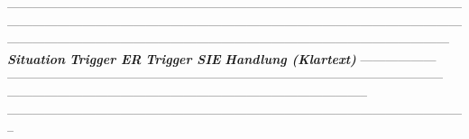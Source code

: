 ---------------------------------------------------------------------------------------------------------------------------------------------------------------------------------------------------------------------------------------------------------------------------------------------------------------------------------
\textbf{\textit{Situation}}    \textbf{\textit{\textcolor{ctmmRed}{Trigger} ER}}                                                                                         \textbf{\textit{\textcolor{ctmmRed}{Trigger} SIE}}                                                                      \textbf{\textit{Handlung (Klartext)}}
------------------ -------------------------------------------------------------------------------------------------------- -------------------------------------------------------------------------------------- --------------------------------------------------------------------------------------------------------------

